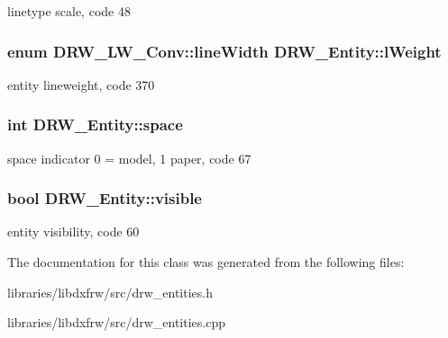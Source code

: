linetype scale, code 48 \hypertarget{classDRW__Entity_a5e01429ed3b7199b17367a5c85970a0d}{
\subsubsection[{l\-Weight}]{\setlength{\rightskip}{0pt plus 5cm}enum {\bf D\-R\-W\-\_\-\-L\-W\-\_\-\-Conv\-::line\-Width} D\-R\-W\-\_\-\-Entity\-::l\-Weight}}\label{classDRW__Entity_a5e01429ed3b7199b17367a5c85970a0d}
entity lineweight, code 370 \hypertarget{classDRW__Entity_aea0364c7833d7c0811b257292278fa7c}{
\subsubsection[{space}]{\setlength{\rightskip}{0pt plus 5cm}int D\-R\-W\-\_\-\-Entity\-::space}}\label{classDRW__Entity_aea0364c7833d7c0811b257292278fa7c}
space indicator 0 = model, 1 paper, code 67 \hypertarget{classDRW__Entity_a410a134f3127298598a0075e60f3616d}{
\subsubsection[{visible}]{\setlength{\rightskip}{0pt plus 5cm}bool D\-R\-W\-\_\-\-Entity\-::visible}}\label{classDRW__Entity_a410a134f3127298598a0075e60f3616d}
entity visibility, code 60 

The documentation for this class was generated from the following files\-:\begin{DoxyCompactItemize}
\item 
libraries/libdxfrw/src/drw\-\_\-entities.\-h\item 
libraries/libdxfrw/src/drw\-\_\-entities.\-cpp\end{DoxyCompactItemize}
